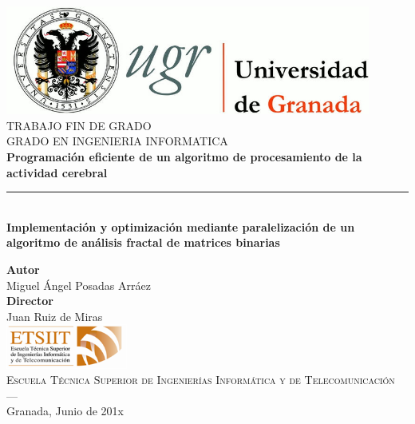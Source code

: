 \begin{titlepage}
\newlength{\centeroffset}
\setlength{\centeroffset}{-0.5\oddsidemargin}
\addtolength{\centeroffset}{0.5\evensidemargin}
\thispagestyle{empty}

\noindent\hspace*{\centeroffset}\begin{minipage}{\textwidth}

\centering
\includegraphics[width=0.9\textwidth]{logos/logo_ugr.jpg}\\[1.4cm]

\textsc{ \Large TRABAJO FIN DE GRADO\\[0.2cm]}
\textsc{ GRADO EN INGENIERIA INFORMATICA}\\[1cm]

{\Huge\bfseries Programación eficiente de un algoritmo de procesamiento de la actividad cerebral \\}
\noindent\rule[-1ex]{\textwidth}{3pt}\\[3.5ex]
{\large\bfseries Implementación y optimización mediante paralelización de un algoritmo de análisis fractal de matrices binarias }
\end{minipage}

\vspace{1cm}
\noindent\hspace*{\centeroffset}
\begin{minipage}{\textwidth}
\centering

\textbf{Autor}\\ {Miguel Ángel Posadas Arráez}\\[2.5ex]
\textbf{Director}\\ Juan Ruiz de Miras\\[2cm]
\includegraphics[width=0.3\textwidth]{logos/etsiit_logo.png}\\[0.1cm]
\textsc{Escuela Técnica Superior de Ingenierías Informática y de Telecomunicación}\\
\textsc{---}\\
Granada, Junio de 201x
\end{minipage}
\end{titlepage}
